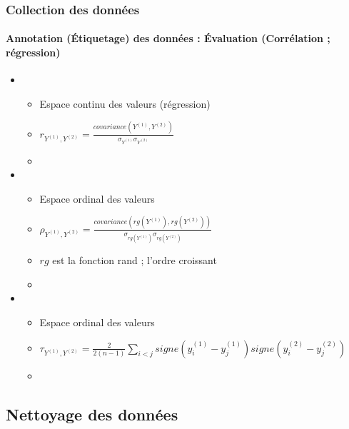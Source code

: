 \documentclass[xcolor=table]{beamer}
\begin{document}
\begin{frame}
	\frametitle{Collection des données}
	\framesubtitle{Annotation (Étiquetage) des données : Évaluation (Corrélation ; régression)}
	
	\begin{itemize}
		\item {}
		\begin{itemize}
			\item Espace continu des valeurs (régression)
			\item $r_{Y^{(1)},Y^{(2)}} = \frac{covariance(Y^{(1)},Y^{(2)})}{\sigma_{Y^{(1)}} \sigma_{Y^{(2)}}}$
			\item {}
		\end{itemize}
		\item {}
		\begin{itemize}
			\item Espace ordinal des valeurs
			\item $\rho_{Y^{(1)},Y^{(2)}} = \frac{covariance(rg(Y^{(1)}),rg(Y^{(2)}))}{\sigma_{rg(Y^{(1)})} \sigma_{rg(Y^{(2)})}}$
			\item $rg$ est la fonction rand ; l'ordre croissant
			\item {}
		\end{itemize}
		\item {}
		\begin{itemize}
			\item Espace ordinal des valeurs
			\item $\tau_{Y^{(1)},Y^{(2)}} = \frac{2}{2 (n-1)} \sum_{i<j} signe(y^{(1)}_i - y^{(1)}_j) signe(y^{(2)}_i - y^{(2)}_j)$
			\item {}
		\end{itemize}
	\end{itemize}
	
\end{frame}

\subsection{Nettoyage des données}
\end{document}
